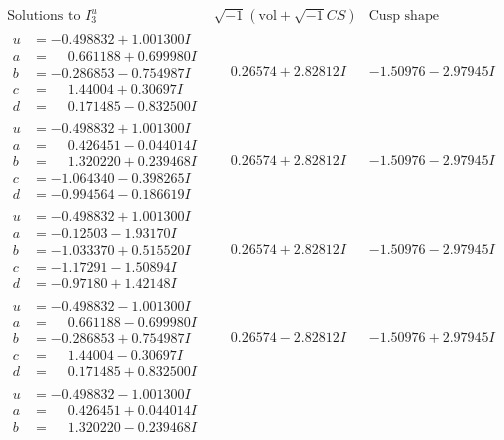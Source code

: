 \documentclass[1p]{elsarticle_modified}
\theoremstyle{definition}
\newcommand{\I}{\sqrt{-1}}
\begin{document}
$$\begin{array}{c|c|c}  
\text{Solutions to }I^u_{3}& \I (\text{vol} + \sqrt{-1}CS) & \text{Cusp shape}\\
 \hline 
\begin{aligned}
u &= -0.498832 + 1.001300 I \\
a &= \phantom{-}0.661188 + 0.699980 I \\
b &= -0.286853 - 0.754987 I \\
c &= \phantom{-}1.44004 + 0.30697 I \\
d &= \phantom{-}0.171485 - 0.832500 I\end{aligned}
 & \phantom{-}0.26574 + 2.82812 I & -1.50976 - 2.97945 I \\ \hline\begin{aligned}
u &= -0.498832 + 1.001300 I \\
a &= \phantom{-}0.426451 - 0.044014 I \\
b &= \phantom{-}1.320220 + 0.239468 I \\
c &= -1.064340 - 0.398265 I \\
d &= -0.994564 - 0.186619 I\end{aligned}
 & \phantom{-}0.26574 + 2.82812 I & -1.50976 - 2.97945 I \\ \hline\begin{aligned}
u &= -0.498832 + 1.001300 I \\
a &= -0.12503 - 1.93170 I \\
b &= -1.033370 + 0.515520 I \\
c &= -1.17291 - 1.50894 I \\
d &= -0.97180 + 1.42148 I\end{aligned}
 & \phantom{-}0.26574 + 2.82812 I & -1.50976 - 2.97945 I \\ \hline\begin{aligned}
u &= -0.498832 - 1.001300 I \\
a &= \phantom{-}0.661188 - 0.699980 I \\
b &= -0.286853 + 0.754987 I \\
c &= \phantom{-}1.44004 - 0.30697 I \\
d &= \phantom{-}0.171485 + 0.832500 I\end{aligned}
 & \phantom{-}0.26574 - 2.82812 I & -1.50976 + 2.97945 I \\ \hline\begin{aligned}
u &= -0.498832 - 1.001300 I \\
a &= \phantom{-}0.426451 + 0.044014 I \\
b &= \phantom{-}1.320220 - 0.239468 I \\

\end{aligned}
\end{array}$$
\end{document}
